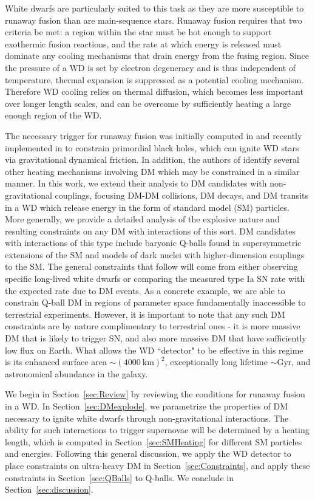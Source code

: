 \documentclass[twocolumn,showpacs,preprintnumbers,amsmath,amssymb,prd]{revtex4}
\begin{document}
White dwarfs are particularly suited to this task as they are more susceptible to runaway fusion than are main-sequence stars.
Runaway fusion requires that two criteria be met: a region within the star must be hot enough to support exothermic fusion reactions, and the rate at which energy is released must dominate any cooling mechanisms that drain energy from the fusing region.
Since the pressure of a WD is set by electron degeneracy and is thus independent of temperature, thermal expansion is suppressed as a potential cooling mechanism.
Therefore WD cooling relies on thermal diffusion, which becomes less important over longer length scales, and can be overcome by sufficiently heating a large enough region of the WD.

The necessary trigger for runaway fusion was initially computed in \cite{Woosley} and recently implemented in \cite{Graham:2015apa} to constrain primordial black holes, which can ignite WD stars via gravitational dynamical friction.
In addition, the authors of \cite{Graham:2015apa} identify several other heating mechanisms involving DM which may be constrained in a similar manner.
In this work, we extend their analysis to DM candidates with non-gravitational couplings, focusing DM-DM collisions, DM decays, and DM transits in a WD which release energy in the form of standard model (SM) particles.
More generally, we provide a detailed analysis of the explosive nature and resulting constraints on any DM with interactions of this sort.
DM candidates with interactions of this type include baryonic Q-balls found in supersymmetric extensions of the SM and models of dark nuclei with higher-dimension couplings to the SM.
The general constraints that follow will come from either observing specific long-lived white dwarfs or comparing the measured type Ia SN rate with the expected rate due to DM events.
As a concrete example, we are able to constrain Q-ball DM in regions of parameter space fundamentally inaccessible to terrestrial experiments.
However, it is important to note that any such DM constraints are by nature complimentary to terrestrial ones - it is more massive DM that is likely to trigger SN, and also more massive DM that have sufficiently low flux on Earth.
What allows the WD ``detector" to be effective in this regime is its enhanced surface area $\sim (4000 ~\text{km})^2$, exceptionally long lifetime $\sim \text{Gyr}$, and astronomical abundance in the galaxy. 

We begin in Section~\ref{sec:Review} by reviewing the conditions for runaway fusion in a WD.
In Section~\ref{sec:DMexplode}, we parametrize the properties of DM necessary to ignite white dwarfs through non-gravitational interactions. 
The ability for such interactions to trigger supernovae will be determined by a heating length, which is computed in Section~\ref{sec:SMHeating} for different SM particles and energies. 
Following this general discussion, we apply the WD detector to place constraints on ultra-heavy DM in Section~\ref{sec:Constraints}, and apply these constraints in Section~\ref{sec:QBalls} to Q-balls.
We conclude in Section~\ref{sec:discussion}.
\end{document}
